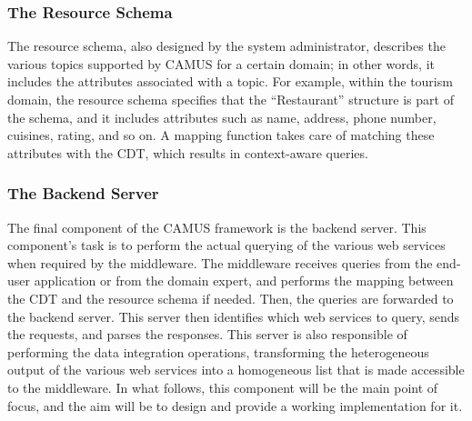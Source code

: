 \subsubsection{The Resource Schema}
The resource schema, also designed by the system administrator, describes the various topics supported by CAMUS for a certain domain; in other words, it includes the attributes associated with a topic. For example, within the tourism domain, the resource schema specifies that the ``Restaurant'' structure is part of the schema, and it includes attributes such as name, address, phone number, cuisines, rating, and so on. A mapping function takes care of matching these attributes with the CDT, which results in context-aware queries.
\subsubsection{The Backend Server}
The final component of the CAMUS framework is the backend server. This component's task is to perform the actual querying of the various web services when required by the middleware. The middleware receives queries from the end-user application or from the domain expert, and performs the mapping between the CDT and the resource schema if needed. Then, the queries are forwarded to the backend server. This server then identifies which web services to query, sends the requests, and parses the responses. This server is also responsible of performing the data integration operations, transforming the heterogeneous output of the various web services into a homogeneous list that is made accessible to the middleware. In what follows, this component will be the main point of focus, and the aim will be to design and provide a working implementation for it.
